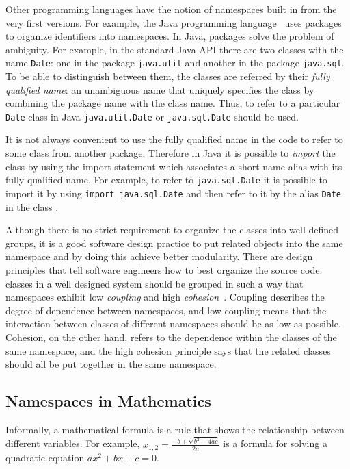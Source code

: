 Other programming languages have the notion of namespaces built in 
from the very first versions. For example, the Java programming 
language~\cite{gosling2014java} uses packages to organize identifiers into 
namespaces. In Java, packages solve the problem of ambiguity. For example, 
in the standard Java API there are two classes with the name \texttt{Date}: 
one in the package \texttt{java.util} and another in the package \texttt{java.sql}. 
To be able to distinguish between them, the classes are referred by their 
\emph{fully qualified name}: an unambiguous name that uniquely specifies the class
by combining the package name with the class name. Thus, to refer to a particular 
\texttt{Date} class in Java  \texttt{java.util.Date} or  \texttt{java.sql.Date} 
should be used. 

It is not always convenient to use the fully qualified name in the code to 
refer to some class from another package. Therefore in Java it is possible to 
\emph{import} the class by using the import statement which associates 
a short name alias with its fully qualified name.
For example, to refer to \texttt{java.sql.Date} it is possible to import 
it by using \texttt{import java.sql.Date} and then refer to it by the alias 
\texttt{Date} in the class \cite{gosling2014java}.


Although there  is no strict requirement to organize the classes into 
well defined groups, it is a good software design practice to put 
related objects into the same namespace and by doing this achieve 
better modularity. There are design principles that tell software engineers 
how to best organize the source code: classes in a well designed system 
should be grouped in such a way that namespaces 
exhibit low \emph{coupling} and high \emph{cohesion}~\cite{larman2005applying}. 
Coupling describes the degree of dependence between namespaces, and 
low coupling means that the interaction between classes of different 
namespaces should be as low as possible. Cohesion, on the other hand,
refers to the dependence within the classes of the same namespace, 
and the high cohesion principle says that the related classes 
should all be put together in the same namespace. 


\subsection{Namespaces in Mathematics}

Informally, a mathematical formula is a rule that shows the relationship
between different variables. For example, 
$x_{1,2} = \frac{-b \pm \sqrt{b^2 - 4 a c}}{2 a}$ is a formula for solving 
a quadratic equation $a x^2 + b x + c = 0$.


